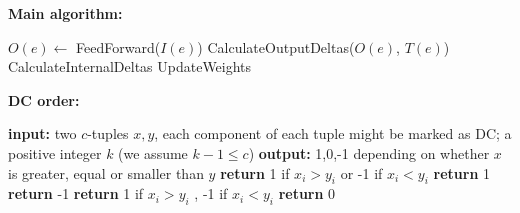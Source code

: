 \documentclass[11pt]{article}
\newcommand{\daniel}[1]{{\textbf{{\small{\color{magenta}DL}: #1{\color{magenta}$\circ$}}}}}
\newcommand{\owen}[1]{\textbf{{\small{\color{red}OK}: #1{\color{red}$\circ$}}}}
\begin{document}
\begin{algorithm}
{
	\textbf{Main algorithm:}
\begin{algorithmic}[1]
		\STATE $O(e) \gets$ FeedForward($I(e)$)
		\STATE CalculateOutputDeltas($O(e)$, $T(e)$)
		\STATE CalculateInternalDeltas
		\STATE UpdateWeights
	\ENDFOR
\end{algorithmic}
}
\textbf{DC order:}
{
\begin{algorithmic}[1]
\STATE \textbf{input:} two $c$-tuples $x,y$, each component of each tuple might be marked as DC; a positive integer $k$ (we assume $k-1\leq c$)
\STATE \textbf{output:} 1,0,-1 depending on whether $x$ is greater, equal or smaller than $y$ 
\STATE \textbf{return} 1 if $x_i>y_i$ or -1 if $x_i<y_i$
\STATE \textbf{return} 1
\STATE \textbf{return} -1
\ENDIF
\ENDFOR
{}
\STATE \textbf{return} 1 if $x_i>y_i$ , -1 if $x_i<y_i$
\ENDFOR
\STATE \textbf{return} 0 
\end{algorithmic}
}
\caption{\label{algo:dcsort}The Backpropagation Training Algorithm %
}

\end{algorithm}


\end{document}
